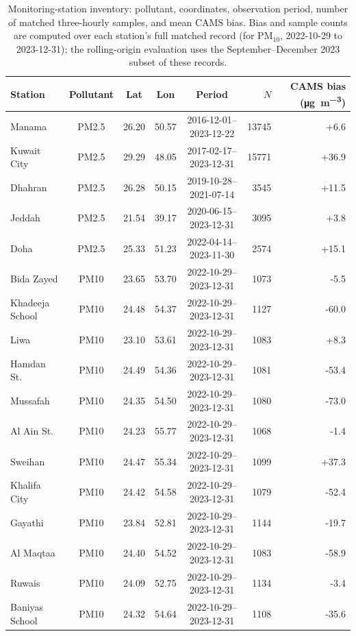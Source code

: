 \documentclass[11pt]{article}
\newcommand*{\pmten}{\ensuremath{\mathrm{PM_{10}}}}
\begin{document}
\clearpage
\begin{table}[htbp]\centering\footnotesize
\caption{Monitoring-station inventory: pollutant, coordinates, observation period, number of matched three-hourly samples, and mean CAMS bias. Bias and sample counts are computed over each station's full matched record (for \pmten{}, 2022-10-29 to 2023-12-31); the rolling-origin evaluation uses the September--December 2023 subset of these records.}
\label{si:t1}
\begin{tabular}{lccccrr}\toprule
Station & Pollutant & Lat & Lon & Period & $N$ & CAMS bias (\si{\micro\gram\per\cubic\metre}) \\ \midrule
Manama & PM2.5 & 26.20 & 50.57 & 2016-12-01--2023-12-22 & 13745 & +6.6 \\
Kuwait City & PM2.5 & 29.29 & 48.05 & 2017-02-17--2023-12-31 & 15771 & +36.9 \\
Dhahran & PM2.5 & 26.28 & 50.15 & 2019-10-28--2021-07-14 & 3545 & +11.5 \\
Jeddah & PM2.5 & 21.54 & 39.17 & 2020-06-15--2023-12-31 & 3095 & +3.8 \\
Doha & PM2.5 & 25.33 & 51.23 & 2022-04-14--2023-11-30 & 2574 & +15.1 \\
Bida Zayed & PM10 & 23.65 & 53.70 & 2022-10-29--2023-12-31 & 1073 & -5.5 \\
Khadeeja School & PM10 & 24.48 & 54.37 & 2022-10-29--2023-12-31 & 1127 & -60.0 \\
Liwa & PM10 & 23.10 & 53.61 & 2022-10-29--2023-12-31 & 1083 & +8.3 \\
Hamdan St. & PM10 & 24.49 & 54.36 & 2022-10-29--2023-12-31 & 1081 & -53.4 \\
Mussafah & PM10 & 24.35 & 54.50 & 2022-10-29--2023-12-31 & 1080 & -73.0 \\
Al Ain St. & PM10 & 24.23 & 55.77 & 2022-10-29--2023-12-31 & 1068 & -1.4 \\
Sweihan & PM10 & 24.47 & 55.34 & 2022-10-29--2023-12-31 & 1099 & +37.3 \\
Khalifa City & PM10 & 24.42 & 54.58 & 2022-10-29--2023-12-31 & 1079 & -52.4 \\
Gayathi & PM10 & 23.84 & 52.81 & 2022-10-29--2023-12-31 & 1144 & -19.7 \\
Al Maqtaa & PM10 & 24.40 & 54.52 & 2022-10-29--2023-12-31 & 1083 & -58.9 \\
Ruwais & PM10 & 24.09 & 52.75 & 2022-10-29--2023-12-31 & 1134 & -3.4 \\
Baniyas School & PM10 & 24.32 & 54.64 & 2022-10-29--2023-12-31 & 1108 & -35.6 \\

\end{tabular}
\end{table}
\end{document}
